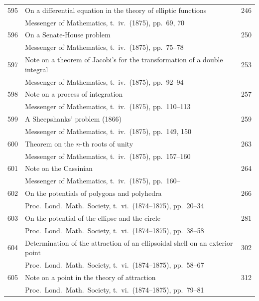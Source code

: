\documentclass[11pt,a4paper]{book}
\begin{document}
\begin{longtable}{r @{. } p{4.8in} r}
595 & On a differential equation in the theory of elliptic functions & 246 \\
  & Messenger of Mathematics, t.\ iv.\ (1875), pp.\ 69, 70 & \\ 

596 & On a Senate-House problem & 250 \\
  & Messenger of Mathematics, t.\ iv.\ (1875), pp.\ 75--78 & \\ 

597 & Note on a theorem of Jacobi's for the transformation of a double integral & 253 \\
  & Messenger of Mathematics, t.\ iv.\ (1875), pp.\ 92--94 & \\ 

598 & Note on a process of integration & 257 \\
  & Messenger of Mathematics, t.\ iv.\ (1875), pp.\ 110--113 & \\ 

599 & A Sheepshanks' problem (1866) & 259 \\
  & Messenger of Mathematics, t.\ iv.\ (1875), pp.\ 149, 150 & \\ 

600 & Theorem on the $n$-th roots of unity & 263 \\
  & Messenger of Mathematics, t.\ iv.\ (1875), pp.\ 157--160 & \\ 

601 & Note on the Cassinian & 264 \\
  & Messenger of Mathematics, t.\ iv.\ (1875), pp.\ 160-- & \\ 

602 & On the potentials of polygons and polyhedra & 266 \\
  & Proc.\ Lond.\ Math.\ Society, t.\ vi.\ (1874--1875), pp.\ 20--34 & \\ 

603 & On the potential of the ellipse and the circle & 281 \\
  & Proc.\ Lond.\ Math.\ Society, t.\ vi.\ (1874--1875), pp.\ 38--58 & \\ 

604 & Determination of the attraction of an ellipsoidal shell on an exterior point & 302 \\
  & Proc.\ Lond.\ Math.\ Society, t.\ vi.\ (1874--1875), pp.\ 58--67 & \\ 

605 & Note on a point in the theory of attraction & 312 \\
  & Proc.\ Lond.\ Math.\ Society, t.\ vi.\ (1874--1875), pp.\ 79--81 & \\ 


\end{longtable}
\end{document}
